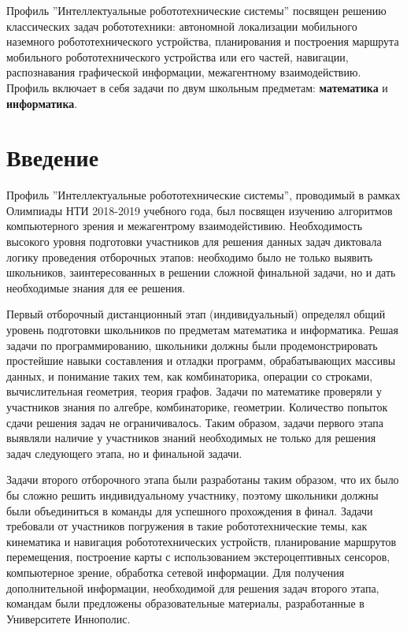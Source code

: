 \documentclass[a4paper,12pt,oneside]{book}
\begin{document}

\setcounter{tocdepth}{1}

\tableofcontents

\newpage 
Профиль ''Интеллектуальные робототехнические системы'' посвящен
решению классических задач робототехники: автономной локализации
мобильного наземного робототехнического устройства, планирования и
построения маршрута мобильного робототехнического устройства или его
частей, навигации, распознавания графической информации, межагентному 
взаимодействию.
Профиль включает в себя задачи по двум школьным предметам:
\textbf{математика} и \textbf{информатика}.

\chapter{Введение}

Профиль ''Интеллектуальные робототехнические системы'', проводимый в
рамках Олимпиады НТИ 2018-2019 учебного года,  был посвящен изучению
алгоритмов компьютерного зрения и межагентрому взаимодейстивию.
Необходимость высокого уровня подготовки участников для решения данных
задач диктовала логику проведения отборочных  этапов: необходимо было
не только выявить школьников, заинтересованных в решении сложной
финальной задачи, но и дать необходимые знания для ее решения.    

Первый отборочный дистанционный этап (индивидуальный) определял общий
уровень подготовки школьников по предметам математика и информатика. 
Решая задачи по программированию, школьники должны были
продемонстрировать простейшие навыки составления и отладки программ,
обрабатывающих  массивы данных, и понимание таких тем, как
комбинаторика, операции со строками, вычислительная геометрия, теория
графов. Задачи по математике проверяли у участников  знания по
алгебре, комбинаторике, геометрии. Количество попыток сдачи решения
задач не ограничивалось. Таким образом, задачи первого этапа выявляли
наличие у участников знаний необходимых не только для решения задач
следующего этапа, но и финальной задачи.

Задачи второго отборочного этапа были разработаны таким образом, что
их было бы сложно решить индивидуальному участнику, поэтому школьники 
должны были объединиться в команды для успешного прохождения в финал. 
Задачи  требовали от участников погружения  в такие робототехнические
темы, как кинематика и навигация робототехнических устройств,
планирование маршрутов перемещения, построение карты с использованием 
экстероцептивных сенсоров, компьютерное зрение, обработка сетевой
информации. Для получения дополнительной информации, необходимой для
решения задач  второго этапа, командам были предложены образовательные
материалы, разработанные в Университете Иннополис.
\end{document}
